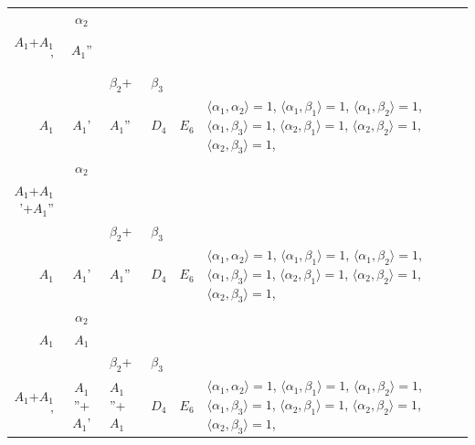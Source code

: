 \documentclass[12pt]{report}
\begin{document}
\begin{appendix}
{\begin{longtable}{rcl p{1cm}p{1cm}p{3cm} }
\\
\begin{tabular}{cc}$\alpha_1$+ & $\alpha_2$\\\tiny{ $A_1$+$A_1$' } & \tiny{ $A_1$'' }\end{tabular} &\begin{tabular}{c} = \\~ \end{tabular} & \begin{tabular}{ccc}$\beta_1$+ & $\beta_2$+ & $\beta_3$\\\tiny{ $A_1$ } & \tiny{ $A_1$' } & \tiny{ $A_1$'' }\end{tabular} & $D_4$ & $E_6$ & $\langle\alpha_1, \alpha_2\rangle=1$,  $\langle\alpha_1, \beta_1\rangle=1$, $\langle\alpha_1, \beta_2\rangle=1$, $\langle\alpha_1, \beta_3\rangle=1$, $\langle\alpha_2, \beta_1\rangle=1$, $\langle\alpha_2, \beta_2\rangle=1$, $\langle\alpha_2, \beta_3\rangle=1$, 
\\
\begin{tabular}{cc}$\alpha_1$+ & $\alpha_2$\\\tiny{ $A_1$+$A_1$'+$A_1$'' } & \tiny{  }\end{tabular} &\begin{tabular}{c} = \\~ \end{tabular} & \begin{tabular}{ccc}$\beta_1$+ & $\beta_2$+ & $\beta_3$\\\tiny{ $A_1$ } & \tiny{ $A_1$' } & \tiny{ $A_1$'' }\end{tabular} & $D_4$ & $E_6$ & $\langle\alpha_1, \alpha_2\rangle=1$,  $\langle\alpha_1, \beta_1\rangle=1$, $\langle\alpha_1, \beta_2\rangle=1$, $\langle\alpha_1, \beta_3\rangle=1$, $\langle\alpha_2, \beta_1\rangle=1$, $\langle\alpha_2, \beta_2\rangle=1$, $\langle\alpha_2, \beta_3\rangle=1$, 
\\
\begin{tabular}{cc}$\alpha_1$+ & $\alpha_2$\\\tiny{ $A_1$ } & \tiny{ $A_1$ }\end{tabular} &\begin{tabular}{c} = \\~ \end{tabular} & \begin{tabular}{ccc}$\beta_1$+ & $\beta_2$+ & $\beta_3$\\\tiny{ $A_1$+$A_1$' } & \tiny{ $A_1$''+$A_1$' } & \tiny{ $A_1$''+$A_1$ }\end{tabular} & $D_4$ & $E_6$ & $\langle\alpha_1, \alpha_2\rangle=1$,  $\langle\alpha_1, \beta_1\rangle=1$, $\langle\alpha_1, \beta_2\rangle=1$, $\langle\alpha_1, \beta_3\rangle=1$, $\langle\alpha_2, \beta_1\rangle=1$, $\langle\alpha_2, \beta_2\rangle=1$, $\langle\alpha_2, \beta_3\rangle=1$, 

\end{longtable}}
\end{appendix}
\end{document}
